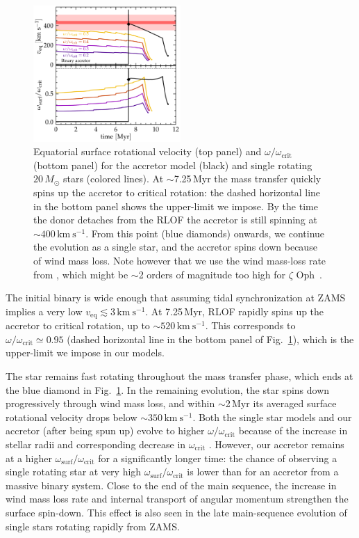 \documentclass[twocolumn,twocolappendix,trackchanges]{aastex63}
\newcommand{\kms}{{\mathrm{km\ s^{-1}}}}
\DeclareRobustCommand{\Figref}[1]{Fig.~\ref{#1}}
\newcommand{\zoph}{$\zeta$ Oph}
\begin{document}
\begin{figure}[tbp]
  \includegraphics[width=0.5\textwidth]{zeta_rot}
  \caption{Equatorial surface rotational velocity (top panel) and
    $\omega/\omega_\mathrm{crit}$ (bottom panel) for the accretor model (black) and single rotating
    $20\,M_\odot$ stars (colored lines). At
    $\sim$7.25\,Myr the mass transfer quickly spins up the accretor to critical rotation: the dashed horizontal line in the bottom panel shows the upper-limit we impose. By the time the donor detaches from the RLOF the accretor is still spinning at
    $\sim$$400\,\kms$. From this point (blue diamonds) onwards, we
    continue the evolution as a single star, and the accretor spins
    down because of wind mass loss.  Note however that we use the wind
    mass-loss rate from \cite{vink:01}, which might be $\sim$2 orders
    of magnitude too high for \zoph\ \citep{marcolino:09}.}
  \label{fig:surf_rot}
\end{figure}



The initial binary is wide enough that assuming tidal synchronization
at ZAMS implies a very low $v_\mathrm{eq}\lesssim 3\,\kms$. At 7.25\,Myr, RLOF rapidly spins
up the accretor to critical rotation, up to
$\sim{}520\,\kms$. This corresponds to
$\omega/\omega_\mathrm{crit}\simeq 0.95$ (dashed horizontal line in
the bottom panel of \Figref{fig:surf_rot}), which is the upper-limit
we impose in our models.

The star remains fast rotating throughout the mass transfer phase,
which ends at the blue diamond in \Figref{fig:surf_rot}. In the
remaining evolution, the star spins down progressively through wind
mass loss, and within $\sim$2\,Myr its averaged surface rotational
velocity drops below
$\sim$$350\,\kms$. Both the single star models and our accretor (after being spun up) evolve to higher
$\omega/\omega_\mathrm{crit}$ because of the increase in stellar radii and corresponding decrease in
$\omega_\mathrm{crit}$ \citep[e.g.,][]{langer:98, zhao:20}. However, our accretor remains at a higher
$\omega_\mathrm{surf}/\omega_\mathrm{crit}$ for a significantly longer time: the chance of observing a single rotating star at very high
$\omega_\mathrm{surf}/\omega_\mathrm{crit}$ is lower than for an accretor from a massive binary system. Close to the end of the main sequence, the increase in wind mass loss rate and internal transport of angular momentum strengthen the surface spin-down. This effect is also seen in the late main-sequence evolution of single stars rotating rapidly from ZAMS.
\end{document}
